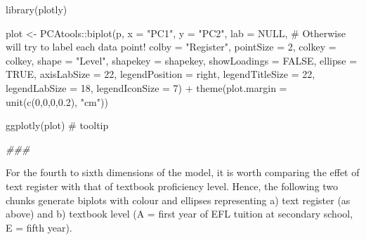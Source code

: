\documentclass[
  letterpaper,
  DIV=11,
  numbers=noendperiod]{scrreprt}
\newenvironment{Shaded}{\begin{snugshade}}{\end{snugshade}}
\newcommand{\AttributeTok}[1]{\textcolor[rgb]{0.40,0.45,0.13}{#1}}
\newcommand{\CommentTok}[1]{\textcolor[rgb]{0.37,0.37,0.37}{#1}}
\newcommand{\ConstantTok}[1]{\textcolor[rgb]{0.56,0.35,0.01}{#1}}
\newcommand{\DecValTok}[1]{\textcolor[rgb]{0.68,0.00,0.00}{#1}}
\newcommand{\DocumentationTok}[1]{\textcolor[rgb]{0.37,0.37,0.37}{\textit{#1}}}
\newcommand{\FloatTok}[1]{\textcolor[rgb]{0.68,0.00,0.00}{#1}}
\newcommand{\FunctionTok}[1]{\textcolor[rgb]{0.28,0.35,0.67}{#1}}
\newcommand{\NormalTok}[1]{\textcolor[rgb]{0.00,0.23,0.31}{#1}}
\newcommand{\OtherTok}[1]{\textcolor[rgb]{0.00,0.23,0.31}{#1}}
\newcommand{\SpecialCharTok}[1]{\textcolor[rgb]{0.37,0.37,0.37}{#1}}
\newcommand{\StringTok}[1]{\textcolor[rgb]{0.13,0.47,0.30}{#1}}
\begin{document}
\begin{Shaded}
\begin{Highlighting}[]
\FunctionTok{library}\NormalTok{(plotly)}

\NormalTok{plot }\OtherTok{\textless{}{-}}\NormalTok{ PCAtools}\SpecialCharTok{::}\FunctionTok{biplot}\NormalTok{(p,}
                 \AttributeTok{x =} \StringTok{"PC1"}\NormalTok{,}
                 \AttributeTok{y =} \StringTok{"PC2"}\NormalTok{,}
                 \AttributeTok{lab =} \ConstantTok{NULL}\NormalTok{, }\CommentTok{\# Otherwise will try to label each data point!}
                 \AttributeTok{colby =} \StringTok{"Register"}\NormalTok{,}
                 \AttributeTok{pointSize =} \DecValTok{2}\NormalTok{,}
                 \AttributeTok{colkey =}\NormalTok{ colkey,}
                 \AttributeTok{shape =} \StringTok{"Level"}\NormalTok{,}
                 \AttributeTok{shapekey =}\NormalTok{ shapekey,}
                 \AttributeTok{showLoadings =} \ConstantTok{FALSE}\NormalTok{,}
                 \AttributeTok{ellipse =} \ConstantTok{TRUE}\NormalTok{,}
                 \AttributeTok{axisLabSize =} \DecValTok{22}\NormalTok{,}
                 \AttributeTok{legendPosition =} \StringTok{\textquotesingle{}right\textquotesingle{}}\NormalTok{,}
                 \AttributeTok{legendTitleSize =} \DecValTok{22}\NormalTok{,}
                 \AttributeTok{legendLabSize =} \DecValTok{18}\NormalTok{, }
                 \AttributeTok{legendIconSize =} \DecValTok{7}\NormalTok{) }\SpecialCharTok{+}
  \FunctionTok{theme}\NormalTok{(}\AttributeTok{plot.margin =} \FunctionTok{unit}\NormalTok{(}\FunctionTok{c}\NormalTok{(}\DecValTok{0}\NormalTok{,}\DecValTok{0}\NormalTok{,}\DecValTok{0}\NormalTok{,}\FloatTok{0.2}\NormalTok{), }\StringTok{"cm"}\NormalTok{))}

\FunctionTok{ggplotly}\NormalTok{(plot) }\CommentTok{\# tooltip}

\DocumentationTok{\#\#\#}
\end{Highlighting}
\end{Shaded}

For the fourth to sixth dimensions of the model, it is worth comparing
the effet of text register with that of textbook proficiency level.
Hence, the following two chunks generate biplots with colour and
ellipses representing a) text register (as above) and b) textbook level
(A = first year of EFL tuition at secondary school, E = fifth year).
\end{document}
